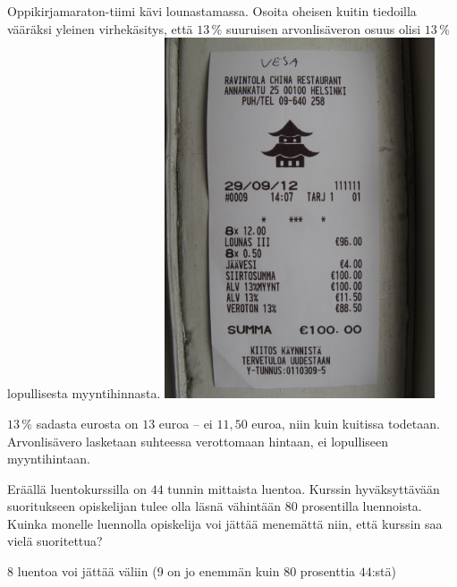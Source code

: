 \begin{tehtavasivu}
\begin{tehtava}
    Oppikirjamaraton-tiimi kävi lounastamassa. Osoita oheisen kuitin tiedoilla vääräksi yleinen virhekäsitys, että $13\,\%$ suuruisen arvonlisäveron osuus olisi $13\,\%$ lopullisesta myyntihinnasta.
    \includegraphics[width=80mm, angle=270]{pictures/alv-kuitti}
    \begin{vastaus}
         $13\,\%$ sadasta eurosta on $13$ euroa -- ei $11,50$ euroa, niin kuin kuitissa todetaan. Arvonlisävero lasketaan suhteessa verottomaan hintaan, ei lopulliseen myyntihintaan.
    \end{vastaus}
\end{tehtava}

\begin{tehtava} %
Eräällä luentokurssilla on $44$ tunnin mittaista luentoa. Kurssin hyväksyttävään suoritukseen opiskelijan tulee olla läsnä vähintään $80$ prosentilla luennoista. Kuinka monelle luennolla opiskelija voi jättää menemättä niin, että kurssin saa vielä suoritettua?
	\begin{vastaus}
	$8$ luentoa voi jättää väliin ($9$ on jo enemmän kuin $80$ prosenttia $44$:stä)
	\end{vastaus}
\end{tehtava}

\begin{tehtava}
    \begin{vastaus}
    \end{vastaus}
\end{tehtava}


\end{tehtavasivu}
